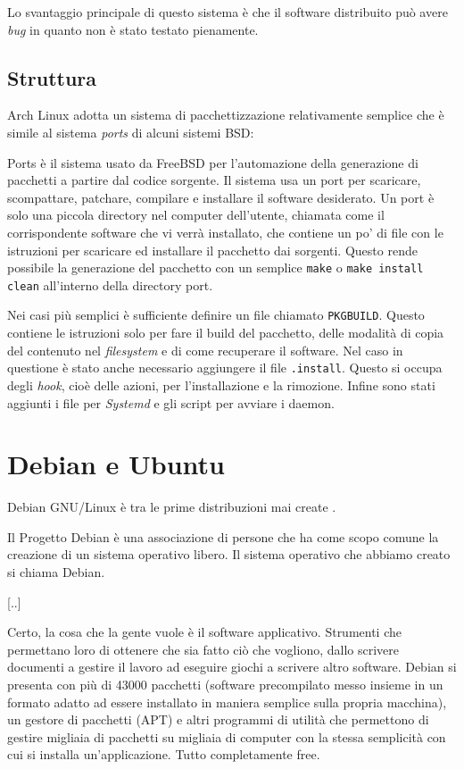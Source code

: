 \documentclass[10pt,titlepage,twoside,a4paper]{report}
\begin{document}
Lo svantaggio principale di questo sistema è che il software distribuito 
può avere \emph{bug} in quanto non è stato testato pienamente.

\subsection{Struttura}
Arch Linux adotta un sistema di pacchettizzazione relativamente semplice 
che è simile al sistema \emph{ports} di alcuni sistemi 
BSD\cite{portsLikeSystem}:
\begin{displayquote}
Ports è il sistema usato da FreeBSD per l'automazione della generazione di 
pacchetti a partire dal codice sorgente. Il sistema usa un port per scaricare, 
scompattare, patchare, compilare e installare il software desiderato. Un port 
è solo una piccola directory nel computer dell'utente, chiamata come il 
corrispondente software che vi verrà installato, che contiene un po' di file 
con le istruzioni per scaricare ed installare il pacchetto dai sorgenti. Questo 
rende possibile la generazione del pacchetto con un semplice \texttt{make} o 
\texttt{make install clean} all'interno della directory port.
\end{displayquote}

Nei casi più semplici è sufficiente definire un file chiamato 
\texttt{PKGBUILD}. Questo contiene le istruzioni solo per fare il build del 
pacchetto, delle modalità di copia del contenuto nel \emph{filesystem} e di 
come recuperare il software. Nel caso in questione è stato anche necessario 
aggiungere il file \texttt{.install}. Questo si occupa degli \emph{hook}, cioè 
delle azioni, per l'installazione e la rimozione. Infine sono stati aggiunti i 
file per \emph{Systemd} e gli script per avviare i daemon.


\section{Debian e Ubuntu}
Debian GNU/Linux è tra le prime distribuzioni mai 
create\cite{debianFirstDistro} \cite{debian}.
\begin{displayquote}
Il Progetto Debian è una associazione di persone che ha come scopo comune la 
creazione di un sistema operativo libero. Il sistema operativo che abbiamo 
creato si chiama Debian.

[..]

Certo, la cosa che la gente vuole è il software applicativo. Strumenti che 
permettano loro di ottenere che sia fatto ciò che vogliono, dallo scrivere 
documenti a gestire il lavoro ad eseguire giochi a scrivere altro software. 
Debian si presenta con più di 43000 pacchetti (software precompilato messo 
insieme in un formato adatto ad essere installato in maniera semplice sulla 
propria macchina), un gestore di pacchetti (APT) e altri programmi di utilità 
che permettono di gestire migliaia di pacchetti su migliaia di computer con la 
stessa semplicità con cui si installa un'applicazione. Tutto completamente 
free. 
\end{displayquote}
\end{document}
